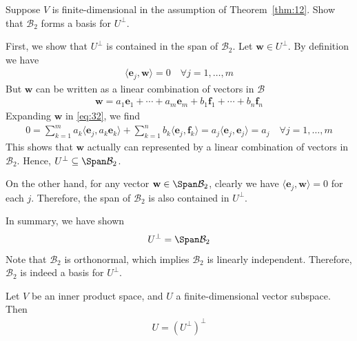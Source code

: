 \documentclass[thmcnt=section, color=blue, 12pt]{my-elegantbook}
\begin{document}
\begin{exercise} \label{ex:2}
	Suppose $V$ is finite-dimensional 
	in the assumption of  Theorem~\ref{thm:12}.
	Show that $\mathcal{B}_2$
	forms a basis for $U^\perp$.
\end{exercise}

\begin{solution}
	First, we show that $U^\perp$ is contained in 
	the span of $\mathcal{B}_2$.
	Let $\mathbf{w} \in U^\perp$.
	By definition we have
	\begin{align}
		\langle \mathbf{e}_j, \mathbf{w} \rangle = 0
		\quad 
		\forall j=1, \ldots, m
		\label{eq:32}
	\end{align}
	But $\mathbf{w}$ can be written as a linear combination
	of vectors in $\mathcal{B}$
	\begin{align*}
		\mathbf{w} = a_1 \mathbf{e}_1 + \cdots 
		+ a_m \mathbf{e}_m + b_1 \mathbf{f}_1 + \cdots + b_n \mathbf{f}_n
	\end{align*}
	Expanding $\mathbf{w}$ in \eqref{eq:32}, we find 
	\begin{align*}
		0 = \sum_{k=1}^m a_k \langle \mathbf{e}_j, a_k \mathbf{e}_k \rangle
			+ \sum_{k=1}^n b_k \langle \mathbf{e}_j, \mathbf{f}_k \rangle
			= a_j \langle \mathbf{e}_j, \mathbf{e}_j \rangle 
			= a_j
			\quad 
			\forall j=1, \ldots, m
	\end{align*}
	This shows that $\mathbf{w}$ actually can represented
	by a linear combination of vectors in $\mathcal{B}_2$.
	Hence, $U^\perp \subseteq \Span \mathcal{B}_2$.

	On the other hand, for any vector $\mathbf{w} \in \Span \mathcal{B}_2$,
	clearly we have $\langle \mathbf{e}_j, \mathbf{w} \rangle = 0$
	for each $j$.
	Therefore, the span of $\mathcal{B}_2$ is also contained in $U^\perp$.

	In summary, we have shown
	\begin{align*}
		U^\perp = \Span \mathcal{B}_2
	\end{align*}
	Note that $\mathcal{B}_2$ is orthonormal, 
	which implies $\mathcal{B}_2$ is linearly independent.
	Therefore, $\mathcal{B}_2$ is indeed a basis for $U^\perp$.
\end{solution}


\begin{corollary} \label{cor:7}
	Let $V$ be an inner product space,
	and $U$ a finite-dimensional vector subspace.
	Then
	\begin{align*}
		U = (U^\perp)^\perp
	\end{align*}
\end{corollary}
\end{document}
